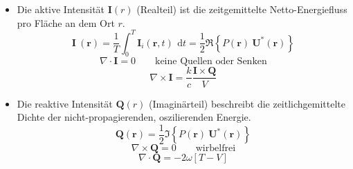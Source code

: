 \begin{itemize}
\item Die aktive Intensität $\mathbf{I}(r)$ (Realteil) ist die zeitgemittelte Netto-Energiefluss pro Fläche an dem Ort $r$.
\begin{equation}
	\mathbf{I}~(\mathbf{r}) = \frac{1}{T}\int_0^T \mathbf{I}_i(\mathbf{r},t)\,~\mathrm{d}t = \frac{1}{2}\Re\left\{P(\mathbf{r})~\mathbf{U}^*(\mathbf{r})\right\}
	\end{equation}
\begin{equation}
	\nabla \cdot \mathbf{I} = 0 \qquad \text{keine Quellen oder Senken}
\end{equation}
\begin{equation}
	\nabla \times \mathbf{I} = \frac{k}{c} \frac{\mathbf{I} \times \mathbf{Q}}{V}
\end{equation}
\item Die reaktive Intensität $\mathbf{Q}(r)$ (Imaginärteil) beschreibt die zeitlichgemittelte Dichte der nicht-propagierenden, oszilierenden Energie. 
\begin{equation}
	\mathbf{Q}(\mathbf{r}) = \frac{1}{2}\Im\left\{P(\mathbf{r})~\mathbf{U}^*(\mathbf{r})\right\}
	\label{helmholtz:equationReaktiveIntensitaet}
	\end{equation}
\begin{equation}
	\nabla \times \mathbf{Q} = 0 \qquad \text{wirbelfrei}
\end{equation}
\begin{equation}
	\nabla \cdot \mathbf{Q} = -2 \omega [T-V]
\end{equation}
\end{itemize}




